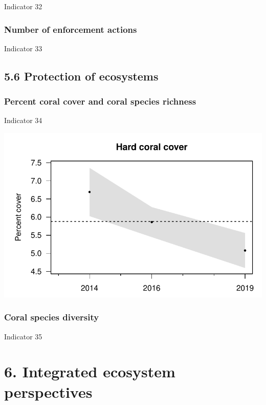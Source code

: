 \documentclass[
  letterpaper,
  oneside,
  open=any]{scrbook}
\begin{document}
Indicator 32

\hypertarget{number-of-enforcement-actions}{%
\subsection{Number of enforcement
actions}\label{number-of-enforcement-actions}}

Indicator 33

\hypertarget{protection-of-ecosystems}{%
\section{5.6 Protection of ecosystems}\label{protection-of-ecosystems}}

\hypertarget{percent-coral-cover-and-coral-species-richness}{%
\subsection{Percent coral cover and coral species
richness}\label{percent-coral-cover-and-coral-species-richness}}

Indicator 34

\includegraphics{Report_book_files/Performance_indicators_files/figure-pdf/unnamed-chunk-4-1.pdf}

\hypertarget{coral-species-diversity}{%
\subsection{Coral species diversity}\label{coral-species-diversity}}

Indicator 35


\hypertarget{integrated-ecosystem-perspectives}{%
\chapter{6. Integrated ecosystem
perspectives}\label{integrated-ecosystem-perspectives}}
\end{document}
